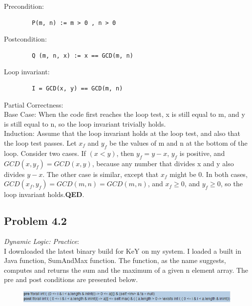 \documentclass[a4paper]{article}
\begin{document}
	Precondition:
	
	\begin{verbatim}
		P(m, n) := m > 0 , n > 0
	\end{verbatim}
	
	Postcondition:
	
	\begin{verbatim}
		Q (m, n, x) := x == GCD(m, n)
	\end{verbatim}
	
	\pagebreak
	
	Loop invariant:
	
	\begin{verbatim}
		I = GCD(x, y) == GCD(m, n)        
	\end{verbatim}
	
	Partial Correctness: \\
	
	Base Case:  When the code first reaches the loop test, x is still equal to m, and y is still equal to n, so the loop invariant trivially holds. \\
	
	Induction:  Assume that the loop invariant holds at the loop test, and also that the loop test passes.
	Let $x_f$ and $y_f$ be the values of m and n at the bottom of the loop.  Consider two cases.  If $(x < y)$, then $y_f = y - x$, $y_f$ is positive, and $GCD(x, y_f) = GCD(x, y)$, because any
	number that divides x and y also divides $y - x$.  The other case is similar, except that $x_f$ might be 0.  In both cases, $GCD(x_f, y_f) = GCD(m, n) = GCD(m, n)$, and $x_f \ge 0$,
	and $y_f \ge 0$, so the loop invariant holds.\textbf{QED}.
	
	\subsection*{Problem 4.2} \textit{Dynamic Logic: Practice}: \\
	
	I downloaded the latest binary build for KeY on my system. I loaded a built in Java function, SumAndMax function. The function, as the name suggests, computes and returns the sum and the maximum of a given n element array. The pre and post conditions are presented below.
	
	\begin{figure}[ht]
		\centering
		\includegraphics[width=1\textwidth, scale=0.7]{prepost.png}
		\caption*{}
		\label{prepost}
	\end{figure}	
	
\end{document}
